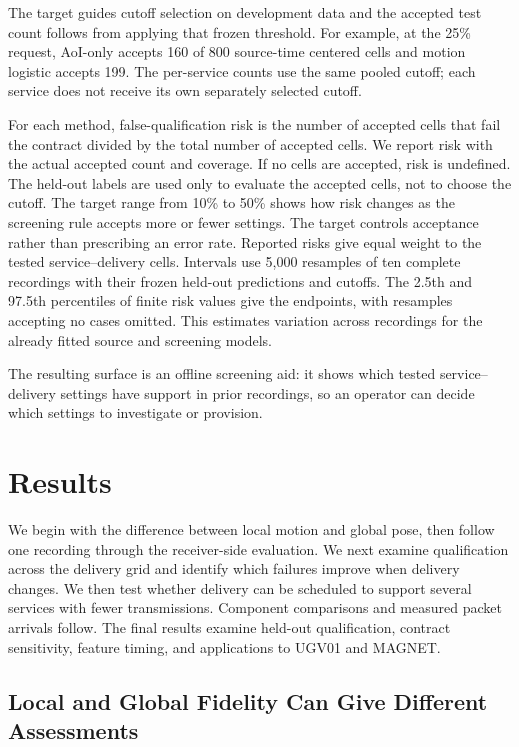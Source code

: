 \documentclass[journal]{IEEEtran}
\newcommand{\new}[1]{#1}
\newcommand{\rev}[1]{#1}
\newcommand{\newrev}[1]{{#1}}
\begin{document}
The target guides cutoff selection on development data and the accepted
test count follows from applying that frozen threshold. For example,
at the 25\% request, AoI-only accepts 160 of 800 \newrev{source-time centered} cells
and motion logistic accepts 199. The
per-service counts use the same pooled cutoff; each service does not
receive its own separately selected cutoff.

For each method, false-qualification risk is the number of accepted
cells that fail the contract divided by the total number of accepted
cells. We report risk with the actual accepted count and coverage. If
no cells are accepted, risk is undefined. The held-out labels are used
only to evaluate the accepted cells, not to choose the cutoff. The
target range from 10\% to 50\% shows how risk changes as the screening
rule accepts more or fewer settings.
\rev{The target controls acceptance rather than prescribing an error
rate. Reported risks give equal weight to the tested service--delivery
cells. Intervals use 5,000 resamples of ten complete recordings with
their frozen held-out predictions and cutoffs. The 2.5th and 97.5th
percentiles of finite risk values give the endpoints, with resamples
accepting no cases omitted. \newrev{This estimates variation across
recordings for the already fitted source and screening models.}}

The resulting surface is an offline screening aid: it shows which
tested service--delivery settings have support in prior recordings,
so an operator can decide which settings to investigate or provision.
\section{Results}
\label{sec:results}

We begin with the difference between local motion and global pose, then
follow one recording through the receiver-side evaluation. We next
examine qualification across the delivery grid and identify which
failures improve when delivery changes. \new{We then test whether
delivery can be scheduled to support several services with fewer
transmissions. Component comparisons and measured packet arrivals follow.
The final results examine held-out qualification, contract sensitivity,
feature timing, and applications to UGV01 and MAGNET.}

\subsection{Local and Global Fidelity Can Give Different Assessments}
\label{subsec:local_global_result}
\end{document}
